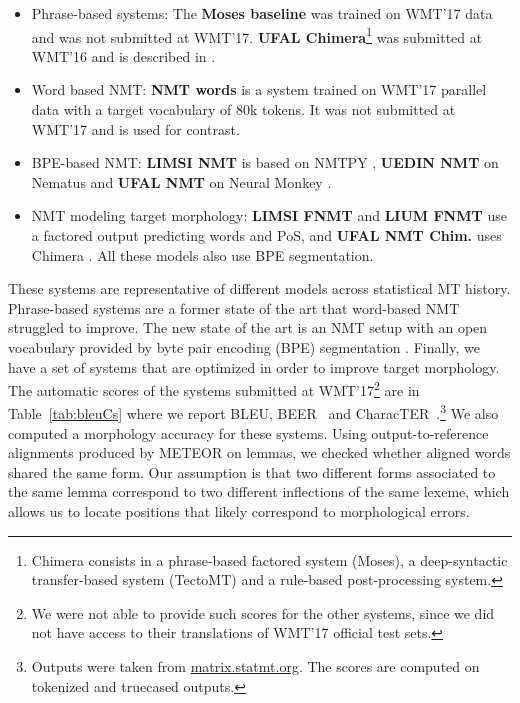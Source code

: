 \documentclass[11pt,letterpaper,final,nohyperref]{article}
\begin{document}
\begin{itemize}
  \item Phrase-based systems: The \textbf{Moses baseline} was trained on
    WMT'17 data and was not submitted at WMT'17. \textbf{UFAL Chimera}\footnote{
    Chimera \cite{bojar13chimera} consists in a phrase-based factored
    system (Moses), a deep-syntactic transfer-based
    system (TectoMT) and a rule-based post-processing system.}
    was submitted at WMT'16 and is described in \cite{tamchyna16wmt}.
  \item Word based NMT: \textbf{NMT words} is a system trained on
    WMT'17 parallel data with a target vocabulary of 80k tokens. It
    was not submitted at WMT'17 and is used for contrast.
  \item BPE-based NMT: \textbf{LIMSI NMT} \cite{burlot16wmt} is based on NMTPY \cite{nmtpy},
    \textbf{UEDIN NMT} \cite{uedin2017wmt} on Nematus \cite{nematus17} and \textbf{UFAL NMT} \cite{cuniwmt17}
    on Neural Monkey \cite{neuralMonkey17}.
  \item NMT modeling target morphology: \textbf{LIMSI FNMT} \cite{burlot16wmt} and
    \textbf{LIUM FNMT} \cite{garcia2017wmtnews} use a factored output predicting words and PoS,
    and \textbf{UFAL NMT Chim.} \cite{cuniwmt17} uses Chimera \cite{bojar13chimera}. All these
    models also use BPE segmentation.
\end{itemize}

These systems are representative of different
models across statistical MT history. Phrase-based
systems are a former state of the art that word-based
NMT struggled to improve. The new state of the art is
an NMT setup with an open vocabulary provided by byte pair
encoding (BPE) segmentation \cite{Sennrich16BPE}. Finally,
we have a set of systems that are optimized in order
to improve target morphology. The automatic scores of the systems submitted at
WMT'17\footnote{We were not able to provide
such scores for the other systems, since we
did not have access to their translations of WMT'17 official test sets.}
are in Table~\ref{tab:bleuCs} where we report
BLEU, BEER~\cite{Stanojevic14beer} and CharacTER~\cite{Wang16character}.\footnote{Outputs were
taken from \url{matrix.statmt.org}. The scores are computed on tokenized and truecased outputs.}
We also computed a morphology accuracy for these systems.
Using output-to-reference alignments produced by METEOR
on lemmas, we checked whether aligned words shared
the same form. Our assumption
is that two different forms associated to the same lemma
correspond to two different inflections of the same lexeme, which allows us to locate
positions that likely correspond to morphological errors.
\end{document}
